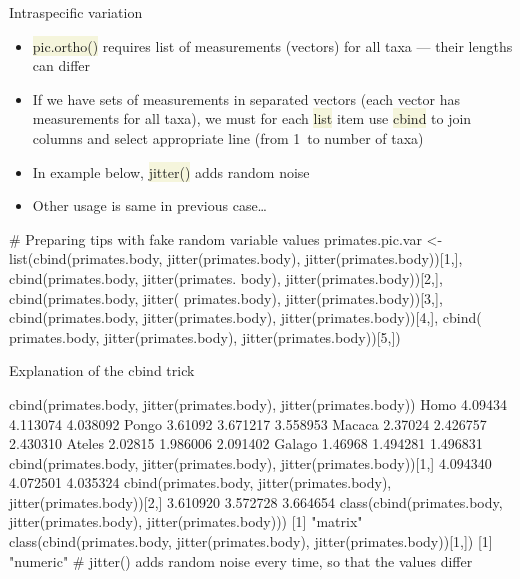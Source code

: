\documentclass[compress, ucs, xelatex, 11pt, xcolor=svgnames, aspectratio=169,
	hyperref={
		bookmarks=true,
		unicode=true,
		colorlinks=true,
		pdftitle={Molecular data in R},
		plainpages=false,
		pdfauthor={Vojtech Zeisek},
		pdfsubject={Course about phylogeny and evolution in R},
		pdfcreator={XeLaTeX},
		pdfkeywords={R, evolution, phylogeny, molecular data},
		linkcolor=Crimson, %
		anchorcolor=Magenta, %
		citecolor=Magenta, %
		filecolor=Magenta, %
		menucolor=Magenta, %
		urlcolor=DodgerBlue, %
		pdftex},
	url={hyphens, lowtilde} %
	]{beamer}
\renewcommand{\texttt}[1]{\colorbox{Beige}{{\ttfamily #1}}}
\begin{document}
\begin{frame}[fragile]{Intraspecific variation}
	\begin{itemize}
		\item \texttt{pic.ortho()} requires list of measurements (vectors) for all taxa --- their lengths can differ
		\item If we have sets of measurements in separated vectors (each vector has measurements for all taxa), we must for each \texttt{list} item use \texttt{cbind} to join columns and select appropriate line (from 1~to number of taxa)
		\item In example below, \texttt{jitter()} adds random noise
		\item Other usage is same in previous case\ldots
	\end{itemize}
	\begin{spluscode}
    # Preparing tips with fake random variable values
    primates.pic.var <- list(cbind(primates.body, jitter(primates.body),
      jitter(primates.body))[1,], cbind(primates.body, jitter(primates.
      body), jitter(primates.body))[2,], cbind(primates.body, jitter(
      primates.body), jitter(primates.body))[3,], cbind(primates.body,
      jitter(primates.body), jitter(primates.body))[4,], cbind(
      primates.body, jitter(primates.body), jitter(primates.body))[5,])
	\end{spluscode}
\end{frame}

\begin{frame}[fragile]{Explanation of the cbind trick}
	\begin{spluscode}
    cbind(primates.body, jitter(primates.body), jitter(primates.body))
    Homo         4.09434 4.113074 4.038092
    Pongo        3.61092 3.671217 3.558953
    Macaca       2.37024 2.426757 2.430310
    Ateles       2.02815 1.986006 2.091402
    Galago       1.46968 1.494281 1.496831
    cbind(primates.body, jitter(primates.body), jitter(primates.body))[1,]
      4.094340      4.072501      4.035324
    cbind(primates.body, jitter(primates.body), jitter(primates.body))[2,]
      3.610920      3.572728      3.664654
    class(cbind(primates.body, jitter(primates.body),
      jitter(primates.body)))
    [1] "matrix"
    class(cbind(primates.body, jitter(primates.body),
      jitter(primates.body))[1,])
    [1] "numeric"
    # jitter() adds random noise every time, so that the values differ
	\end{spluscode}
\end{frame}
\end{document}
